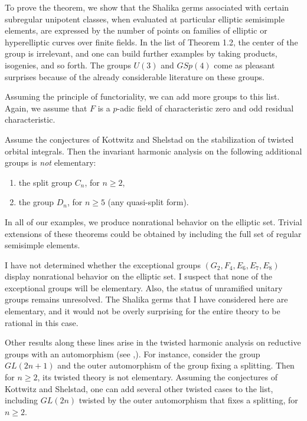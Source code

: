 \documentclass{amsart}
\begin{document}
To prove the theorem, we show that the Shalika germs associated with
certain subregular unipotent classes, when evaluated at particular
elliptic semisimple elements,  are expressed by the number
of points on families of elliptic or
hyperelliptic curves over finite fields.  In the list of Theorem 1.2, 
the center
of the group is irrelevant, and one can build  further
examples by taking products, isogenies, and so forth.
The groups $U(3)$ and $GSp(4)$ come as
pleasant surprises because of the
already considerable literature
on these groups. 

Assuming the principle of
functoriality, we can add more groups to this list.  Again, we assume
that $F$ is a $p$-adic field of characteristic zero and odd
residual characteristic.

Assume the conjectures of Kottwitz
and Shelstad on the stabilization of twisted orbital integrals.
Then the invariant harmonic analysis on the following additional groups
is {\it not} elementary:
\begin{enumerate}[label=(\arabic*)]
\item the split group $C_n$, for $n\ge 2$, 
\item the group $D_n$, for $n\ge 5$ (any quasi-split form).
\end{enumerate}
\endproclaim

In all of our examples, we produce nonrational behavior
on the elliptic set.  Trivial extensions of these
theorems could be obtained by including the full set
of regular semisimple elements.

I have not determined whether the exceptional groups $(G_2,F_4,E_6,E_7,E_8)$
display nonrational behavior on the elliptic set.  
I suspect that 
none of the exceptional groups will be elementary.  Also,
the status of unramified unitary groups remains 
unresolved.
The Shalika germs that I have considered here are elementary,
and it would not be overly surprising for the entire theory to
be rational in this case.

Other results along these lines arise in 
the twisted harmonic analysis on reductive groups
with an automorphism (see \cite{KS1},\cite{KS2}).
For instance, consider the group $GL(2n+1)$
and the outer automorphism of the group fixing a splitting.  
Then for $n\ge 2$, its
twisted theory is not elementary.  Assuming the conjectures
of Kottwitz and Shelstad, one can add 
several other twisted cases to the list, including
$GL(2n)$ twisted by the
outer automorphism that fixes a splitting, for $n\ge 2$.
\end{document}
